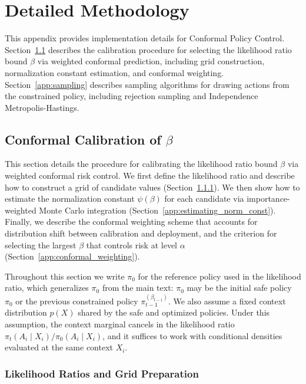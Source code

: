 \section{Detailed Methodology}
\label{app:detailed_methodology}

This appendix provides implementation details for Conformal Policy Control. Section~\ref{app:conformal_calibration} describes the calibration procedure for selecting the likelihood ratio bound $\beta$ via weighted conformal prediction, including grid construction, normalization constant estimation, and conformal weighting. Section~\ref{app:sampling} describes sampling algorithms for drawing actions from the constrained policy, including rejection sampling and Independence Metropolis-Hastings.

\subsection{Conformal Calibration of $\beta$}
\label{app:conformal_calibration}


This section details the procedure for calibrating the likelihood ratio bound $\beta$ via weighted conformal risk control. We first define the likelihood ratio and describe how to construct a grid of candidate values (Section~\ref{app:lr_grid_prep}). We then show how to estimate the normalization constant $\psi(\beta)$ for each candidate via importance-weighted Monte Carlo integration (Section~\ref{app:estimating_norm_const}). Finally, we describe the conformal weighting scheme that accounts for distribution shift between calibration and deployment, and the criterion for selecting the largest $\beta$ that controls risk at level $\alpha$ (Section~\ref{app:conformal_weighting}).

\begin{remark}
Throughout this section we write $\pi_0$ for the reference policy used in the likelihood ratio, which generalizes $\pi_0$ from the main text: $\pi_0$ may be the initial safe policy $\pi_0$ or the previous constrained policy $\pi_{t-1}^{(\beta_{t-1})}$. We also assume a fixed context distribution $p(X)$ shared by the safe and optimized policies. Under this assumption, the context marginal cancels in the likelihood ratio $\pi_t(A_i \mid X_i) / \pi_0(A_i \mid X_i)$, and it suffices to work with conditional densities evaluated at the same context $X_i$.
\end{remark}

\subsubsection{Likelihood Ratios and Grid Preparation}
\label{app:lr_grid_prep}

